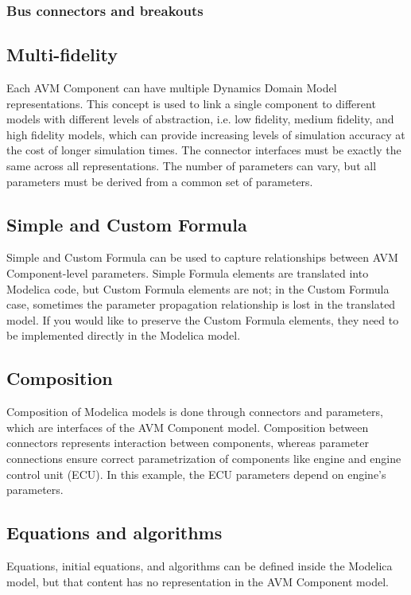 \subsubsection{Bus connectors and breakouts}


\subsection{Multi-fidelity}
Each AVM Component can have multiple Dynamics Domain Model representations. This concept is used to link a single component to 
different models with different levels of abstraction, i.e. low fidelity, medium fidelity, and high fidelity models, which can
provide increasing levels of simulation accuracy at the cost of longer simulation times. The connector interfaces must be 
exactly the same across all representations. The number of parameters can vary, but all parameters must be derived from a common 
set of parameters.


\subsection{Simple and Custom Formula}
Simple and Custom Formula can be used to capture relationships between AVM Component-level parameters. Simple Formula elements 
are translated into Modelica code, but Custom Formula elements are not; in the Custom Formula case, sometimes the parameter propagation 
relationship is lost in the translated model. If you would like to preserve the Custom Formula elements, they need to be implemented 
directly in the Modelica model.

\subsection{Composition}
Composition of Modelica models is done through connectors and parameters, which are interfaces of the AVM Component model. Composition between connectors represents interaction between components, whereas parameter connections ensure correct parametrization of components like engine and engine control unit (ECU). In this example, the ECU parameters depend on engine's parameters.

\subsection{Equations and algorithms}
Equations, initial equations, and algorithms can be defined inside the Modelica model, but that content has no representation in the AVM Component model.



